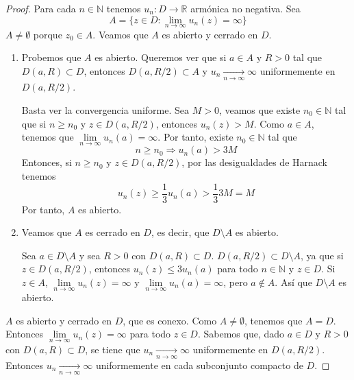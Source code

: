 \begin{proof}
    Para cada $n \in \mathbb{N}$ tenemos $u_n: D \to \mathbb{R}$ armónica no negativa.
    Sea
    $$A = \{z \in D : \lim\limits_{n \to \infty} u_n(z) = \infty\}$$
    $A \neq \emptyset$ porque $z_0 \in A$.
    Veamos que $A$ es abierto y cerrado en $D$.

    \begin{enumerate}
        \item Probemos que $A$ es abierto.
              Queremos ver que si $a \in A$ y $R > 0$ tal que $D(a, R) \subset D$, entonces $D(a, R/2) \subset A$ y $u_n \xrightarrow[n \to \infty]{} \infty$ uniformemente en $D(a, R/2)$.

              Basta ver la convergencia uniforme.
              Sea $M > 0$, veamos que existe $n_0 \in \mathbb{N}$ tal que si $n \geq n_0$ y $z \in D(a, R/2)$, entonces $u_n(z) > M$.
              Como $a \in A$, tenemos que $\lim\limits_{n \to \infty} u_n(a) = \infty$.
              Por tanto, existe $n_0 \in \mathbb{N}$ tal que
              $$n \geq n_0 \Rightarrow u_n(a) > 3M$$
              Entonces, si $n \geq n_0$ y $z \in D(a, R/2)$, por las desigualdades de Harnack tenemos
              $$u_n(z) \geq \frac{1}{3}u_n(a) > \frac{1}{3}3M = M$$
              Por tanto, $A$ es abierto.

        \item Veamos que $A$ es cerrado en $D$, es decir, que $D \setminus A$ es abierto.

              Sea $a \in D \setminus A$ y sea $R > 0$ con $D(a, R) \subset D$.
              $D(a, R/2) \subset D \setminus A$, ya que si $z \in D(a, R/2)$, entonces $u_n(z) \leq 3u_n(a)$ para todo $n \in \mathbb{N}$ y $z \in D$.
              Si $z \in A$, $\lim\limits_{n \to \infty} u_n(z) = \infty$ y $\lim\limits_{n \to \infty} u_n(a) = \infty$, pero $a \notin A$.
              Así que $D \setminus A$ es abierto.
    \end{enumerate}

    $A$ es abierto y cerrado en $D$, que es conexo.
    Como $A \neq \emptyset$, tenemos que $A = D$.
    Entonces $\lim\limits_{n \to \infty} u_n(z) = \infty$ para todo $z \in D$.
    Sabemos que, dado $a \in D$ y $R > 0$ con $D(a, R) \subset D$, se tiene que $u_n \xrightarrow[n \to \infty]{} \infty$ uniformemente en $D(a, R/2)$.
    Entonces $u_n \xrightarrow[n \to \infty]{} \infty$ uniformemente en cada subconjunto compacto de $D$.
\end{proof}

